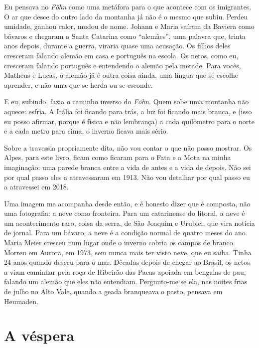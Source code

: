 \documentclass[
  brazilian,
  11pt,
  openany]{book}
\begin{document}
Eu pensava no \emph{Föhn} como uma metáfora para o que acontece com os
imigrantes. O ar que desce do outro lado da montanha já não é o mesmo
que subiu. Perdeu umidade, ganhou calor, mudou de nome. Johann e Maria
saíram da Baviera como bávaros e chegaram a Santa Catarina como
``alemães'', uma palavra que, trinta anos depois, durante a guerra,
viraria quase uma acusação. Os filhos deles cresceram falando alemão em
casa e português na escola. Os netos, como eu, cresceram falando
português e entendendo o alemão pela metade. Para vocês, Matheus e
Lucas, o alemão já é outra coisa ainda, uma língua que se escolhe
aprender, e não uma que se herda ou se esconde.

E eu, subindo, fazia o caminho inverso do \emph{Föhn}. Quem sobe uma
montanha não aquece: esfria. A Itália foi ficando para trás, a luz foi
ficando mais branca, e (isso eu posso afirmar, porque é física e não
lembrança) a cada quilômetro para o norte e a cada metro para cima, o
inverno ficava mais sério.

Sobre a travessia propriamente dita, não vou contar o que não posso
mostrar. Os Alpes, para este livro, ficam como ficaram para o Fata e a
Mota na minha imaginação: uma parede branca entre a vida de antes e a
vida de depois. Não sei por qual passo eles a atravessaram em 1913. Não
vou detalhar por qual passo eu a atravessei em 2018.

Uma imagem me acompanha desde então, e é honesto dizer que é composta,
não uma fotografia: a neve como fronteira. Para um catarinense do
litoral, a neve é um acontecimento raro, coisa da serra, de São Joaquim
e Urubici, que vira notícia de jornal. Para um bávaro, a neve é a
condição normal de quatro meses do ano. Maria Meier cresceu num lugar
onde o inverno cobria os campos de branco. Morreu em Aurora, em 1973,
sem nunca mais ter visto neve, que eu saiba. Tinha 24 anos quando desceu
para o mar. Décadas depois de chegar ao Brasil, os netos a viam caminhar
pela roça de Ribeirão das Pacas apoiada em bengalas de pau, falando um
alemão que eles não entendiam. Pergunto-me se ela, nas noites frias de
julho no Alto Vale, quando a geada branqueava o pasto, pensava em
Heumaden.

\section{A véspera}\label{a-vuxe9spera}
\end{document}

